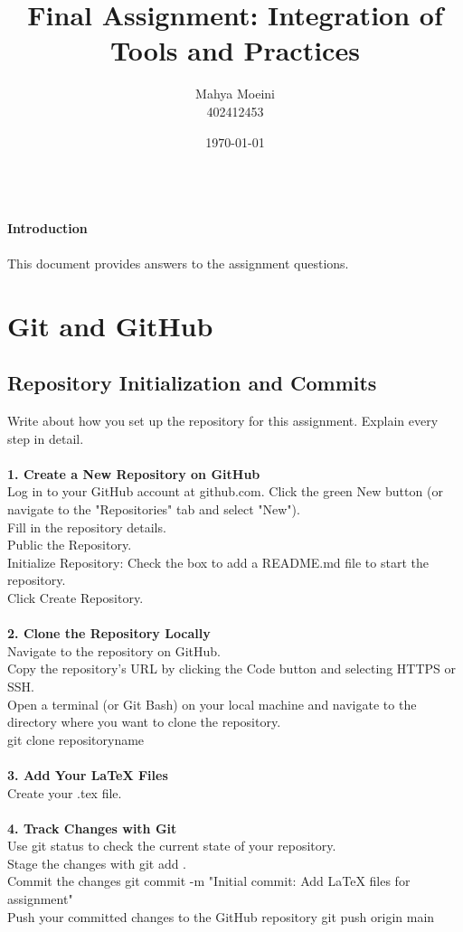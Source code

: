 \documentclass[a4paper,12pt]{article}
\title{\textbf{Final Assignment: Integration of Tools and Practices}}
\author{Mahya Moeini\\402412453}
\date{\today}
\begin{document}
\maketitle


\\\textbf{Introduction}
\\
\\This document provides answers to the assignment questions.

\clearpage


\tableofcontents
\clearpage


\section{Git and GitHub}

\subsection{Repository Initialization and Commits}
Write about how you set up the repository for this assignment. Explain every step in detail.
\\
\\\textbf{1. Create a New Repository on GitHub}
\\Log in to your GitHub account at github.com.
Click the green New button (or navigate to the "Repositories" tab and select "New").
\\Fill in the repository details.
\\Public the Repository.
\\Initialize Repository: Check the box to add a README.md file to start the repository.
\\Click Create Repository.
\\
\\\textbf{2. Clone the Repository Locally}
\\Navigate to the repository on GitHub.
\\Copy the repository’s URL by clicking the Code button and selecting HTTPS or SSH.
\\Open a terminal (or Git Bash) on your local machine and navigate to the directory where you want to clone the repository.
\\git clone repositoryname
\\
\\\textbf{3. Add Your LaTeX Files}
\\Create your .tex file.
\\
\\\textbf{4. Track Changes with Git}
\\Use git status to check the current state of your repository.
\\Stage the changes with git add .
\\Commit the changes git commit -m "Initial commit: Add LaTeX files for assignment"
\\Push your committed changes to the GitHub repository  git push origin main
\\
\\
\\
\\
\end{document}

